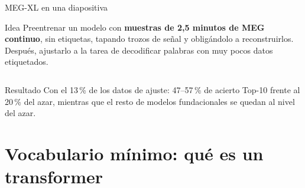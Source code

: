 \documentclass[aspectratio=169,10pt]{beamer}
\newcommand{\bigmetric}[2]{{\huge\bfseries\color{deepgreen}{#1}\par}\vspace{0.8mm}{\scriptsize #2\par}\vspace{3mm}}
\newcommand{\term}[1]{\textbf{\color{deepgreen}#1}}
\begin{document}
\begin{frame}[c]{MEG-XL en una diapositiva}
  \small
  \begin{block}{Idea}
    Preentrenar un modelo con \term{muestras de 2,5 minutos de MEG continuo}, sin etiquetas, tapando trozos de señal y obligándolo a reconstruirlos. Después, ajustarlo a la tarea de decodificar palabras con muy pocos datos etiquetados.
  \end{block}
  \vspace{1mm}
  \begin{columns}[c,totalwidth=\linewidth]
    \begin{column}{0.24\linewidth}\centering\bigmetric{150\,s}{contexto por muestra}\end{column}
    \begin{column}{0.24\linewidth}\centering\bigmetric{191k}{posiciones de entrada}\end{column}
    \begin{column}{0.24\linewidth}\centering\bigmetric{20M}{parámetros (vs 200M del supervisado)}\end{column}
    \begin{column}{0.24\linewidth}\centering\bigmetric{$\sim$300\,h}{MEG de $>$800 sujetos}\end{column}
  \end{columns}
  \vspace{1mm}
  \begin{exampleblock}{Resultado}
    Con el 13\,\% de los datos de ajuste: 47--57\,\% de acierto Top-10 frente al 20\,\% del azar, mientras que el resto de modelos fundacionales se quedan al nivel del azar.
  \end{exampleblock}
\end{frame}

\section{Vocabulario mínimo: qué es un transformer}
\end{document}

